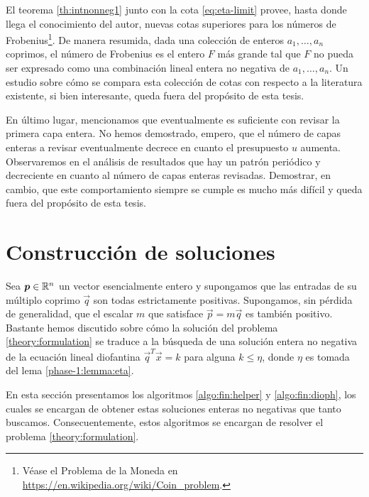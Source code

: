 El teorema \ref{th:intnonneg1} junto con la cota \eqref{eq:eta-limit} provee, hasta donde llega el
conocimiento del autor, nuevas cotas superiores para los números de Frobenius\footnote{
	Véase el Problema de la Moneda en \url{https://en.wikipedia.org/wiki/Coin_problem}.
}. De manera resumida,
dada una colección de enteros $a_1, \ldots, a_n$ coprimos, el número de Frobenius es el entero $F$
más grande tal que $F$ no pueda ser expresado como una combinación lineal entera no negativa de
$a_1, \ldots, a_n$. Un estudio sobre cómo se compara esta colección de cotas con respecto a la
literatura existente, si bien interesante, queda fuera del propósito de esta tesis.

En último lugar, mencionamos que eventualmente es suficiente con revisar la primera capa entera. No
hemos demostrado, empero, que el número de capas enteras a revisar eventualmente decrece en cuanto
el presupuesto $u$ aumenta. Observaremos en el análisis de resultados que hay un patrón periódico y
decreciente en cuanto al número de capas enteras revisadas. Demostrar, en cambio, que este
comportamiento siempre se cumple es mucho más difícil y queda fuera del propósito de esta tesis.

\section{Construcción de soluciones}
\label{subsec:complex}

\noindent
Sea $\boldsymbol{p} \in \mathbb{R}^n$ un vector esencialmente entero y supongamos que las entradas de su múltiplo
coprimo $\vec{q}$ son todas estrictamente positivas. Supongamos, sin pérdida de generalidad, que el
escalar $m$ que satisface $\vec{p} = m\vec{q}$ es también positivo. Bastante hemos discutido sobre
cómo la solución del problema \eqref{theory:formulation} se traduce a la búsqueda de una solución
entera no negativa de la ecuación lineal diofantina $\vec{q}^T\vec{x} = k$ para alguna $k \leq \eta$,
donde $\eta$ es tomada del lema \ref{phase-1:lemma:eta}.

En esta sección presentamos los algoritmos \ref{algo:fin:helper} y \ref{algo:fin:dioph}, los cuales
se encargan de obtener estas soluciones enteras no negativas que tanto buscamos. Consecuentemente,
estos algoritmos se encargan de resolver el problema \eqref{theory:formulation}.


